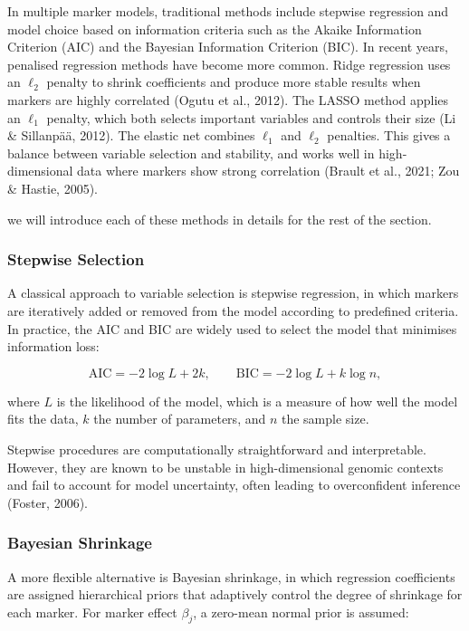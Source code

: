 \documentclass[
  letterpaper,
  DIV=11,
  numbers=noendperiod]{scrartcl}
\begin{document}
In multiple marker models, traditional methods include stepwise
regression and model choice based on information criteria such as the
Akaike Information Criterion (AIC) and the Bayesian Information
Criterion (BIC). In recent years, penalised regression methods have
become more common. Ridge regression uses an \(\ell_2\) penalty to
shrink coefficients and produce more stable results when markers are
highly correlated (Ogutu et al., 2012). The LASSO method applies an
\(\ell_1\) penalty, which both selects important variables and controls
their size (Li \& Sillanpää, 2012). The elastic net combines \(\ell_1\)
and \(\ell_2\) penalties. This gives a balance between variable
selection and stability, and works well in high-dimensional data where
markers show strong correlation (Brault et al., 2021; Zou \& Hastie,
2005).

we will introduce each of these methods in details for the rest of the
section.

\subsubsection{Stepwise Selection}\label{stepwise-selection}

A classical approach to variable selection is stepwise regression, in
which markers are iteratively added or removed from the model according
to predefined criteria. In practice, the AIC and BIC are widely used to
select the model that minimises information loss:

\[
\text{AIC} = -2 \log L + 2k, \qquad 
\text{BIC} = -2 \log L + k \log n,
\]

where \(L\) is the likelihood of the model, which is a measure of how
well the model fits the data, \(k\) the number of parameters, and \(n\)
the sample size.

Stepwise procedures are computationally straightforward and
interpretable. However, they are known to be unstable in
high-dimensional genomic contexts and fail to account for model
uncertainty, often leading to overconfident inference (Foster, 2006).

\subsubsection{Bayesian Shrinkage}\label{bayesian-shrinkage}

A more flexible alternative is Bayesian shrinkage, in which regression
coefficients are assigned hierarchical priors that adaptively control
the degree of shrinkage for each marker. For marker effect \(\beta_j\),
a zero-mean normal prior is assumed:
\end{document}
